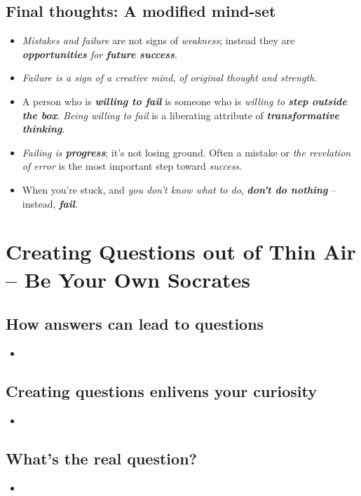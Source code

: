 \documentclass[11pt]{article}
\begin{document}
\subsection{Final thoughts: A modified mind-set}
\begin{itemize}
\item \emph{Mistakes and failure} are not signs of \emph{weakness}; instead they are \emph{\textbf{opportunities} for \textbf{future success}}. 

\item \emph{Failure is a sign of a creative mind}, \emph{of original thought and strength}.

\item A person who is \emph{\textbf{willing to fail}} is someone who is \emph{willing to \textbf{step outside the box}}. \emph{Being willing
to fail} is a liberating attribute of \emph{\textbf{transformative thinking}}.

\item \textit{Failing is \textbf{progress}}; it’s not losing ground. Often a mistake or \emph{the revelation of error} is the most important step toward \emph{success}. 

\item When you’re stuck, and \emph{you don’t know what to do}, \emph{\textbf{don’t do nothing}} -- instead, \emph{\textbf{fail}}. 
\end{itemize}

\section{Creating Questions out of Thin Air -- Be Your Own Socrates}
\subsection{How answers can lead to questions}
\begin{itemize}
\item
\end{itemize}

\subsection{Creating questions enlivens your curiosity}
\begin{itemize}
\item
\end{itemize}

\subsection{What's the real question?}
\begin{itemize}
\item
\end{itemize}
\end{document}
